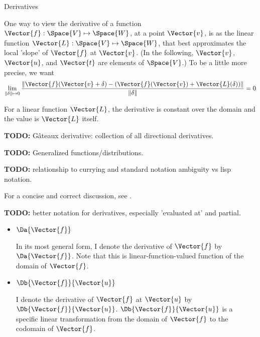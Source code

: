\begin{plSection}{Derivatives}
\label{sec:Derivatives}

One way to view the derivative of a 
function~\cite{wiki:FrechetDerivative}
$\Vector{f} : \Space{V} \mapsto \Space{W}$,
at a point $\Vector{v}$,
is as the linear function $\Vector{L}:\Space{V} \mapsto \Space{W}$,
that best approximates the local 'slope' of $\Vector{f}$ at $\Vector{v}$.
(In the following, $\Vector{v}$, $\Vector{u}$, and $\Vector{t}$ are elements of $\Space{V}$.)
To be a little more precise, we want
\begin{equation}
\lim_{ \|{\bf \delta}  \| \mapsto 0}
\frac{ \| \Vector{f}(\Vector{v} + {\bf \delta}) - (\Vector{f}(\Vector{v}) + \Vector{L}({\bf\delta})) \|}
{\|{\bf \delta}  \| }
 = 0
\end{equation}

\begin{plNote}{}{}
For a linear function $\Vector{L}$,
the derivative is constant over the domain
and the value is $\Vector{L}$ itself.
\end{plNote}

\textbf{TODO:} G\^{a}teaux derivative: collection of all
directional derivatives.

\textbf{TODO:} Generalized functions/distributions.

\textbf{TODO:}
relationship to currying and standard notation ambiguity vs
lisp notation.

For a concise and correct discussion, 
see .

\textbf{TODO:} better notation for derivatives, especially 
'evaluated at' and partial.

\begin{itemize}

\item $\Da{\Vector{f}}$

In its most general form,
I denote the derivative of $\Vector{f}$ by $\Da{\Vector{f}}$.
Note that this is linear-function-valued function 
of the domain of $\Vector{f}$.

\item $\Db{\Vector{f}}{\Vector{u}}$

I denote the derivative of $\Vector{f}$ at $\Vector{u}$ by $\Db{\Vector{f}}{\Vector{u}}$.
$\Db{\Vector{f}}{\Vector{u}}$ is a specific linear transformation from
the domain of $\Vector{f}$ to the codomain of $\Vector{f}$.


\end{itemize}
\end{plSection}
